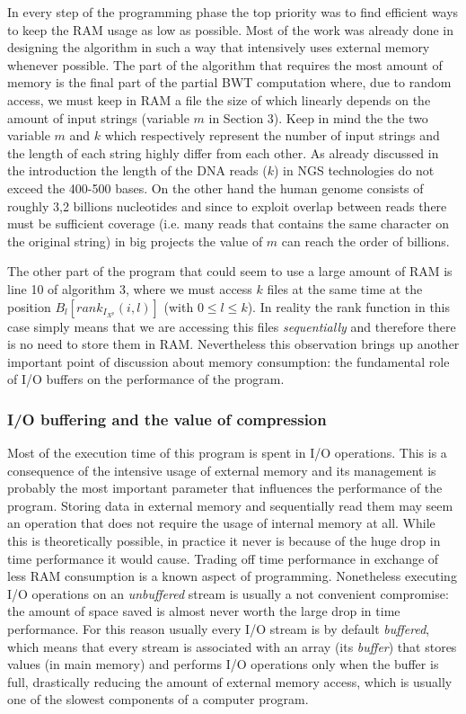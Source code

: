 \documentclass[a4paper,12pt, oneside]{article}
\begin{document}
In every step of the programming phase the top priority was to find efficient ways to keep the RAM usage as low as possible. Most of the work was already done in designing the algorithm in such a way that intensively uses external memory whenever possible. The part of the algorithm that requires the most amount of memory is the final part of the partial BWT computation where, due to random access, we must keep in RAM a file the size of which linearly depends on the amount of input strings (variable $m$ in Section 3). Keep in mind the the two variable $m$ and $k$ which respectively represent the number of input strings and the length of each string highly differ from each other. As already discussed in the introduction the length of the DNA reads ($k$) in NGS technologies do not exceed the 400-500 bases. On the other hand the human genome consists of roughly 3,2 billions nucleotides and since to exploit overlap between reads there must be sufficient coverage (i.e. many reads that contains the same character on the original string) in big projects the value of $m$ can reach the order of billions. 
\par
The other part of the program that could seem to use a large amount of RAM is line 10 of algorithm 3, where we must access $k$ files at the same time at the position $B_l[rank_{I_{X^p}}(i,l)]$ (with $0 \leq l \leq k$). In reality the  rank function in this case simply means that we are accessing this files \textit{sequentially} and therefore there is no need to store them in RAM. Nevertheless this observation brings up another important point of discussion about memory consumption: the fundamental role of I/O buffers on the performance of the program.  
 
\subsubsection{I/O buffering and the value of compression}

Most of the execution time of this program is spent in I/O operations. This is a consequence of the intensive usage of external memory and its management is probably the most important parameter that influences the performance of the program. Storing data in external memory and sequentially read them may seem an operation that does not require the usage of internal memory at all. While this is theoretically possible, in practice it never is because of the huge drop in time performance it would cause. Trading off time performance in exchange of less RAM consumption is a known aspect of programming. Nonetheless executing I/O  operations on an \textit{unbuffered} stream is usually a not convenient compromise: the amount of space saved is almost never worth the large drop in time performance. For this reason usually every I/O stream is by default \textit{buffered}, which means that every stream is associated with an array (its \textit{buffer}) that stores values (in main memory) and performs I/O operations only when the buffer is full, drastically reducing the amount of external memory access, which is usually one of the slowest components of a computer program.
\par
\end{document}

